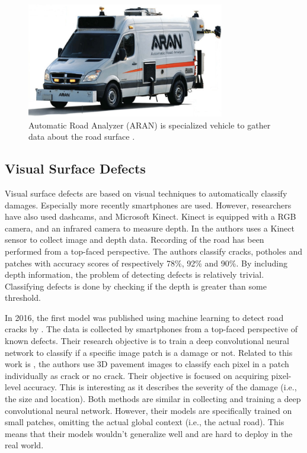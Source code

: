 \begin{figure}[h!]
\begin{center}
\includegraphics[height=5cm,keepaspectratio]{images/2_literature/aran.png}
\end{center}
\caption{Automatic Road Analyzer (ARAN) is specialized vehicle to gather data about the road surface \cite{Gupta2020}.}
\label{fig:aran-vehicle}
\end{figure}

\subsection{Visual Surface Defects}
\label{sec:visual-surface-defects}

Visual surface defects are based on visual techniques to automatically classify damages. Especially more recently smartphones are used. However, researchers have also used dashcams, and Microsoft Kinect. Kinect is equipped with a RGB camera, and an infrared camera to measure depth. In  the authors uses a Kinect sensor to collect image and depth data. Recording of the road has been performed from a top-faced perspective. The authors classify cracks, potholes and patches with accuracy scores of respectively 78\%, 92\% and 90\%. By including depth information, the problem of detecting defects is relatively trivial. Classifying defects is done by checking if the depth is greater than some threshold.

In 2016, the first model was published using machine learning to detect road cracks by . The data is collected by smartphones from a top-faced perspective of known defects. Their research objective is to train a deep convolutional neural network to classify if a specific image patch is a damage or not. Related to this work is , the authors use 3D pavement images to classify each pixel in a patch individually as crack or no crack. Their objective is focused on acquiring pixel-level accuracy. This is interesting as it describes the severity of the damage (i.e., the size and location). Both methods are similar in collecting and training a deep convolutional neural network. However, their models are specifically trained on small patches, omitting the actual global context (i.e., the actual road). This means that their models wouldn't generalize well and are hard to deploy in the real world.

